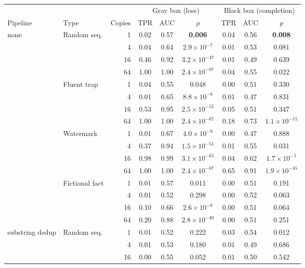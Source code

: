 \begin{tabular}{llrcccccc}
\toprule
 & & & \multicolumn{3}{c}{Gray box (loss)} & \multicolumn{3}{c}{Black box (completion)} \\
\cmidrule(lr){4-6}\cmidrule(lr){7-9}
Pipeline & Type & Copies & TPR & AUC & $p$ & TPR & AUC & $p$ \\
\midrule
none & Random seq. & 1 & 0.02 & 0.57 & \textbf{0.006} & 0.04 & 0.56 & \textbf{0.008} \\
 &  & 4 & 0.04 & 0.64 & \textbf{$2.9{\times}10^{-7}$} & 0.01 & 0.53 & 0.081 \\
 &  & 16 & 0.46 & 0.92 & \textbf{$3.2{\times}10^{-47}$} & 0.01 & 0.49 & 0.639 \\
 &  & 64 & 1.00 & 1.00 & \textbf{$2.4{\times}10^{-67}$} & 0.04 & 0.55 & 0.022 \\
 & Fluent trap & 1 & 0.04 & 0.55 & 0.048 & 0.00 & 0.51 & 0.330 \\
 &  & 4 & 0.01 & 0.65 & \textbf{$8.8{\times}10^{-8}$} & 0.01 & 0.47 & 0.831 \\
 &  & 16 & 0.53 & 0.95 & \textbf{$2.5{\times}10^{-55}$} & 0.05 & 0.51 & 0.347 \\
 &  & 64 & 1.00 & 1.00 & \textbf{$2.4{\times}10^{-67}$} & 0.18 & 0.73 & \textbf{$1.1{\times}10^{-15}$} \\
 & Watermark & 1 & 0.01 & 0.67 & \textbf{$4.0{\times}10^{-9}$} & 0.00 & 0.47 & 0.888 \\
 &  & 4 & 0.37 & 0.94 & \textbf{$1.5{\times}10^{-51}$} & 0.01 & 0.55 & 0.031 \\
 &  & 16 & 0.98 & 0.99 & \textbf{$3.1{\times}10^{-65}$} & 0.04 & 0.62 & \textbf{$1.7{\times}10^{-5}$} \\
 &  & 64 & 1.00 & 1.00 & \textbf{$2.4{\times}10^{-67}$} & 0.65 & 0.91 & \textbf{$1.9{\times}10^{-45}$} \\
 & Fictional fact & 1 & 0.01 & 0.57 & 0.011 & 0.00 & 0.51 & 0.191 \\
 &  & 4 & 0.01 & 0.52 & 0.298 & 0.00 & 0.52 & 0.063 \\
 &  & 16 & 0.10 & 0.66 & \textbf{$2.6{\times}10^{-8}$} & 0.00 & 0.51 & 0.064 \\
 &  & 64 & 0.20 & 0.88 & \textbf{$2.8{\times}10^{-40}$} & 0.00 & 0.51 & 0.251 \\
\midrule
substring dedup & Random seq. & 1 & 0.01 & 0.52 & 0.222 & 0.03 & 0.54 & 0.012 \\
 &  & 4 & 0.01 & 0.53 & 0.180 & 0.01 & 0.49 & 0.686 \\
 &  & 16 & 0.00 & 0.55 & 0.052 & 0.01 & 0.50 & 0.542 \\

\end{tabular}
